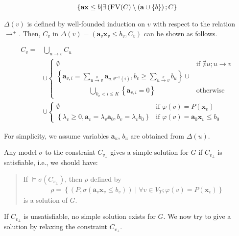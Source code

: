 \documentclass[a4paper,12pt]{article}
\begin{document}
\begin{align*}
\left\lbrace
 \mathbf{a} \mathbf{x} \leq b \middle|
 \exists \left( \textsc{FV}(C)
  \setminus (\mathbf{a} \cup \left\lbrace b \right\rbrace
 \right); C
\right\rbrace
\end{align*}

$\Delta(v)$ is defined by well-founded induction on $v$ with respect
to the relation $\rightarrow^+$. Then, $C_v$ in
$\Delta(v) = \left( \mathbf{a}_v \mathbf{x}_v \leq b_v, C_v \right)$
can be shown as follows.

\begin{align*}
C_v = & \bigcup_{u \rightarrow v} C_u
\\
& \cup \begin{cases}
\emptyset
& \mbox{if } \nexists u; u \rightarrow v \\
\left\lbrace
 \mathbf{a}_{v,i} = \sum_{u \xrightarrow{\theta} v} \mathbf{a}_{u, \theta^{-1} (i)},
 b_v \geq \sum_{u \xrightarrow{\theta} v} b_u
\right\rbrace \cup \\
\hspace{2cm} \bigcup_{k_v < i \leq K} \left\lbrace \mathbf{a}_{v,i} = 0 \right\rbrace
& \mbox{otherwise}
\end{cases}
\\
& \cup \begin{cases}
\emptyset
& \mbox{if } \varphi(v) = P(\mathbf{x}_v) \\
\left\lbrace
 \lambda_v \geq 0, \mathbf{a}_v = \lambda_v \mathbf{a}_0,
 b_v = \lambda_v b_0
\right\rbrace
& \mbox{if } \varphi(v) = \mathbf{a}_0 \mathbf{x}_v \leq b_0
\end{cases}
\end{align*}

For simplicity, we assume variables $\mathbf{a}_u$, $b_u$ are obtained
from $\Delta(u)$.

Any model $\sigma$ to the constraint $C_{v_\bot}$ gives a simple
solution for $G$ if $C_{v_\bot}$ is satisfiable, i.e., we should have:

\begin{quote}
If $\models \sigma(C_{v_\bot})$, then $\rho$ defined by
\begin{align*}
 \rho = \left\lbrace
  \left( P, \sigma(\mathbf{a}_v \mathbf{x}_v \leq b_v) \right) \middle|
  \forall v \in V_T; \varphi(v) = P(\mathbf{x}_v)
 \right\rbrace
\end{align*}
is a solution of $G$.
\end{quote}

If $C_{v_\bot}$ is unsatisfiable, no simple solution exists for
$G$. We now try to give a solution by relaxing the constraint
$C_{v_\bot}$.
\end{document}
